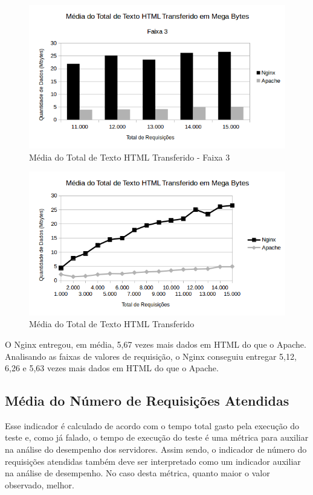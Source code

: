 \begin{figure}[H]
	\centering
	\includegraphics[width=1\linewidth]{graficos/grafico3-f3} 
	\caption{Média do Total de Texto HTML Transferido - Faixa 3}
	\label{fig:grafico3-f3}
\end{figure}

\begin{figure}[H]
	\centering
	\includegraphics[width=1\linewidth]{graficos/grafico3} 
	\caption{Média do Total de Texto HTML Transferido}
	\label{fig:grafico3}
\end{figure}

O Nginx entregou, em média, 5,67 vezes mais dados em HTML do que o Apache. 
Analisando as faixas de valores de requisição, o Nginx conseguiu entregar 5,12, 
6,26 e 5,63 vezes mais dados em HTML do que o Apache.

\subsection{Média do Número de Requisições Atendidas}

Esse indicador é calculado de acordo com o tempo total gasto pela execução do 
teste e, como já falado, o tempo de execução do teste é uma métrica para 
auxiliar na análise do desempenho dos servidores. Assim sendo, o indicador de 
número do requisições atendidas também deve ser interpretado como um indicador 
auxiliar na análise de desempenho. No caso desta métrica, quanto maior o valor 
observado, melhor.

